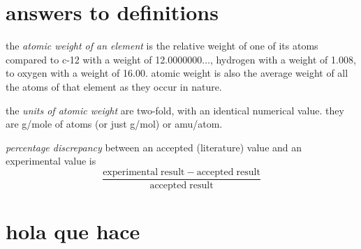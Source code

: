 \documentclass{article}
\begin{document}

\section{answers to definitions}

\begin{enumerate}
  \begin{item}
    the \emph{atomic weight of an element} is the relative weight of
    one of its atoms compared to c-12 with a weight of
    12.0000000$\ldots$, hydrogen with a weight of 1.008, to oxygen
    with a weight of 16.00. atomic weight is also the average weight
    of all the atoms of that element as they occur in nature.
  \end{item}
  \begin{item}
    the \emph{units of atomic weight} are two-fold, with an identical
    numerical value. they are g/mole of atoms (or just g/mol) or
    amu/atom.
  \end{item}
  \begin{item}
    \emph{percentage discrepancy} between an accepted (literature)
    value and an experimental value is
    \begin{equation*}
      \frac{\mathrm{experimental\;result} - \mathrm{accepted\;result}}{\mathrm{accepted\;result}}
    \end{equation*}
  \end{item}
\end{enumerate}


\section[hola que hace]{hola que hace}
\begin{equation}
  \label{eq1}
\end{equation}






\tableofcontents{}
\end{document}
